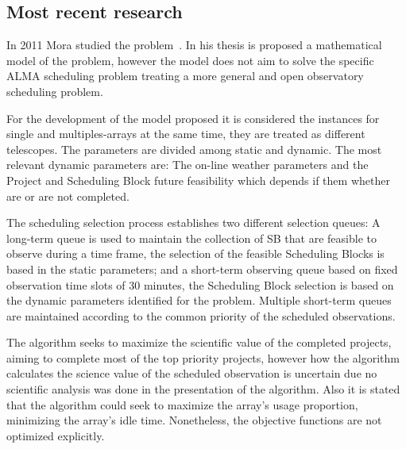 \subsection{Most recent research}
In 2011 Mora studied the problem~\cite{mora11}. In his thesis is proposed a mathematical model of the problem, however the model does not aim to solve the specific ALMA scheduling problem treating a more general and open observatory scheduling problem. 

For the development of the model proposed it is considered the instances for single and multiples-arrays at the same time, they are treated as different telescopes. The parameters are divided among static and dynamic. The most relevant dynamic parameters are: The on-line weather parameters and the Project and Scheduling Block future feasibility which depends if them whether are or are not completed.

The scheduling selection process establishes two different selection queues: A long-term queue is used to maintain the collection of SB that are feasible to observe during a time frame, the selection of the feasible Scheduling Blocks is based in the static parameters; and a short-term observing queue based on fixed observation time slots of 30 minutes, the Scheduling Block selection is based on the dynamic parameters identified for the problem. Multiple short-term queues are maintained according to the common priority of the scheduled observations.

The algorithm seeks to maximize the scientific value of the completed projects, aiming to complete most of the top priority projects, however how the algorithm calculates the science value of the scheduled observation is uncertain due no scientific analysis was done in the presentation of the algorithm. Also it is stated that the algorithm could seek to maximize the array's usage proportion, minimizing the array's idle time. Nonetheless, the objective functions are not optimized explicitly.